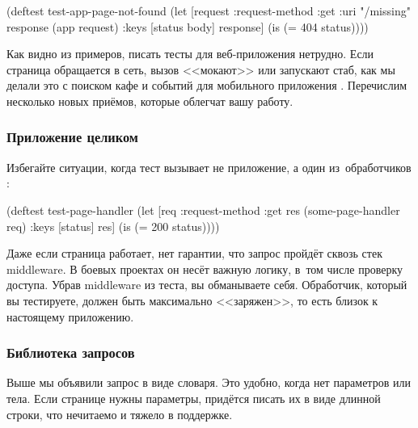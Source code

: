 \else

\begin{english}
  \begin{clojure}
(deftest test-app-page-not-found
  (let [request {:request-method :get :uri "/missing"}
        response (app request)
        {:keys [status body]} response]
    (is (= 404 status))))
  \end{clojure}
\end{english}

\fi


Как видно из примеров, писать тесты для веб-приложения нетрудно. Если страница
обращается в сеть, вызов <<мокают>> или запускают стаб, как мы делали это с
поиском кафе и событий для мобильного приложения .
Перечислим несколько новых приёмов, которые облегчат вашу работу.

\subsubsection*{Приложение целиком}

Избегайте ситуации, когда тест вызывает не приложение, а один из~обработчиков
:

\begin{english}
  \begin{clojure/lines}
(deftest test-page-handler
  (let [req {:request-method :get}
        res (some-page-handler req)
        {:keys [status]} res]
    (is (= 200 status))))
  \end{clojure/lines}
\end{english}

Даже если страница работает, нет гарантии, что запрос пройдёт сквозь стек
middleware. В боевых проектах он несёт важную логику, в~том числе проверку
доступа. Убрав middleware из теста, вы обманываете себя. Обработчик, который вы
тестируете, должен быть максимально <<заряжен>>, то есть близок к настоящему
приложению.

\subsubsection*{Библиотека запросов}

Выше мы объявили запрос в виде словаря. Это удобно, когда нет параметров или
тела. Если странице нужны параметры, придётся писать их в виде длинной строки,
что нечитаемо и тяжело в поддержке.

\ifnarrow

